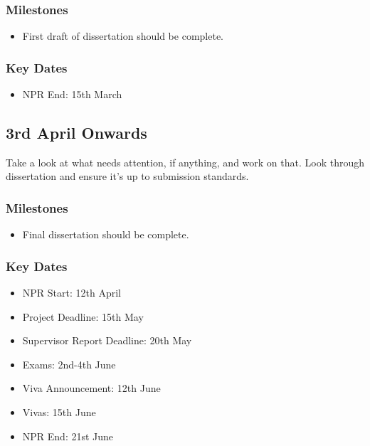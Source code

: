 \documentclass[12pt]{article}
\begin{document}
\subsubsection*{Milestones}
\begin{itemize}
	\item First draft of dissertation should be complete.
\end{itemize}

\subsubsection*{Key Dates}
\begin{itemize}
	\item NPR End: 15th March
\end{itemize}

\subsection*{3rd April Onwards}%

Take a look at what needs attention, if anything, and work on that. Look through dissertation and ensure it's up to submission standards.

\subsubsection*{Milestones}
\begin{itemize}
	\item Final dissertation should be complete.
\end{itemize}

\subsubsection*{Key Dates}
\begin{itemize}
	\item NPR Start: 12th April
	\item Project Deadline: 15th May
	\item Supervisor Report Deadline: 20th May
	\item Exams: 2nd-4th June
	\item Viva Announcement: 12th June
	\item Vivas: 15th June
	\item NPR End: 21st June
\end{itemize}
\end{document}
